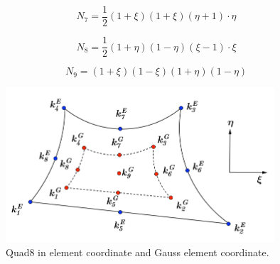 \documentclass{article}
\begin{document}
\begin{equation}
N_7 = \frac{1}{2} \left(1 + \xi \right) \left( 1 + \xi \right)  \left( \eta + 1\right) \cdot\eta
\end{equation}

\begin{equation}
N_8 = \frac{1}{2} \left(1 + \eta \right) \left( 1 - \eta \right)  \left( \xi - 1\right) \cdot\xi
\end{equation}

\begin{equation}
N_9 = \left(1 + \xi \right) \left( 1 - \xi \right)  \left( 1 + \eta \right) \left(1 - \eta \right)
\end{equation}



\begin{figure}[h]
	\begin{center}
		\includegraphics[width=10cm,clip]{Quad8_1.pdf}			
		\caption{Quad8 in element coordinate and Gauss element coordinate.} \label{fig: Quad8_1}
	\end{center} 
\end{figure}
\end{document}
